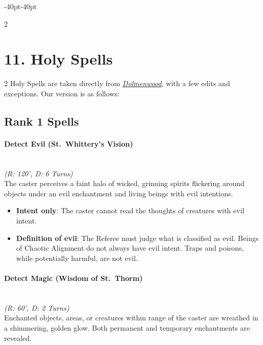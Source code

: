\documentclass{book}
\providecommand{\tightlist}{%
\setlength{\itemsep}{0pt}\setlength{\parskip}{0pt}}
\begin{document}
\begin{adjustwidth}{-40pt}{-40pt}
\begin{multicols}{2}
\newpage
\end{multicols}

\section*{11. Holy Spells}\label{holy-spells}

\begin{multicols}{2}
Holy Spells are taken directly from
\emph{\href{https://www.dolmenwood.necroticgnome.com/rules/doku.php?id=holy_magic}{Dolmenwood}},
with a few edits and exceptions. Our version is as follows:

\subsection*{Rank 1 Spells}\label{rank-1-holy}

\paragraph{Detect Evil (St.~Whittery's
	Vision)}\label{detect-evil-st.-whitterys-vision}\mbox{}\\
\emph{(R: 120', D: 6 Turns)}\\
The caster perceives a faint halo of wicked, grinning spirits flickering
around objects under an evil enchantment and living beings with evil
intentions.

\begin{itemize}
	\tightlist
	\item
	\textbf{Intent only}: The caster cannot read the thoughts of creatures
	with evil intent.
	\item
	\textbf{Definition of evil}: The Referee must judge what is classified
	as evil. Beings of Chaotic Alignment do not always have evil intent.
	Traps and poisons, while potentially harmful, are not evil.
\end{itemize}

\paragraph{Detect Magic (Wisdom of
	St.~Thorm)}\label{detect-magic-wisdom-of-st.-thorm}\mbox{}\\
\emph{(R: 60', D: 2 Turns)}\\
Enchanted objects, areas, or creatures within range of the caster are
wreathed in a shimmering, golden glow. Both permanent and temporary
enchantments are revealed.


\end{multicols}
\end{adjustwidth}
\end{document}
